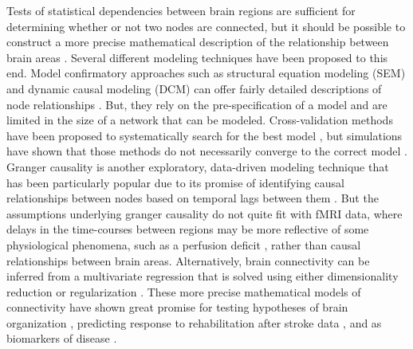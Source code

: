 Tests of statistical dependencies between brain regions are sufficient for determining whether or not two nodes are connected, but it should be possible to construct a more precise mathematical description of the relationship between brain areas \cite{Friston1994}. Several different modeling techniques have been proposed to this end. Model confirmatory approaches such as structural equation modeling (SEM) \cite{Buchel1997} and dynamic causal modeling (DCM) \cite{Friston2003} can offer fairly detailed descriptions of node relationships . But, they rely on the pre-specification of a model and are limited in the size of a network that can be modeled. Cross-validation methods have been proposed to systematically search for the best model \cite{Zhuang2005,Penny2010,James2009}, but simulations have shown that those methods do not necessarily converge to the correct model \cite{Lohmann2012}. Granger causality is another exploratory, data-driven modeling technique that has been particularly popular due to its promise of identifying causal relationships between nodes based on temporal lags between them \cite{Deshpande2011}. But the assumptions underlying granger causality do not quite fit with fMRI data\cite{Smith2011}, where delays in the time-courses between regions may be more reflective of some physiological phenomena, such as a perfusion deficit \cite{Lv2013}, rather than causal relationships between brain areas. Alternatively, brain connectivity can be inferred from a multivariate regression  that is solved using either dimensionality reduction \cite{Friston1994} or regularization \cite{Craddock2013b}. These more precise mathematical models of connectivity have shown great promise for testing hypotheses of brain organization \cite{Craddock2013b}, predicting response to rehabilitation after stroke data \cite{James2009b}, and as biomarkers of disease \cite{Brodersen2011}.

